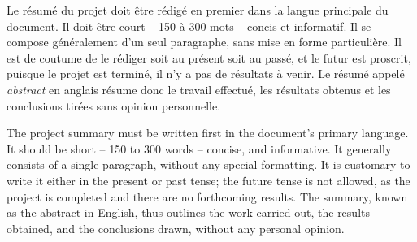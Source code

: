 
Le résumé du projet doit être rédigé en premier dans la langue principale du document. Il doit être court -- 150 à 300 mots -- concis et informatif. Il se compose généralement d'un seul paragraphe, sans mise en forme particulière. Il est de coutume de le rédiger soit au présent soit au passé, et le futur est proscrit, puisque le projet est terminé, il n'y a pas de résultats à venir. Le résumé appelé \emph{abstract} en anglais résume donc le travail effectué, les résultats obtenus et les conclusions tirées sans opinion personnelle.

\asterism

The project summary must be written first in the document's primary language. It should be short -- 150 to 300 words -- concise, and informative. It generally consists of a single paragraph, without any special formatting. It is customary to write it either in the present or past tense; the future tense is not allowed, as the project is completed and there are no forthcoming results. The summary, known as the abstract in English, thus outlines the work carried out, the results obtained, and the conclusions drawn, without any personal opinion.
